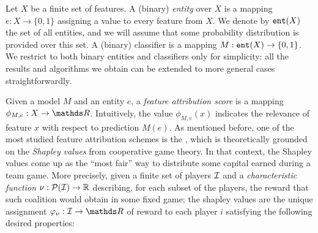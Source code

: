 

Let $X$ be a finite set of features. A (binary) \textit{entity} over $X$ is a mapping $e:X \to \{0, 1\}$ assigning a value to every feature from $X$. We denote by $\texttt{ent}{}(X)$ the set of all entities, and we will assume that some probability distribution is provided over this set.
A (binary) classifier is a mapping $M: \texttt{ent}{}(X) \to \{0, 1\}$. We restrict to both binary entities and classifiers only for simplicity: all the results and algorithms we obtain can be extended to more general cases straightforwardly. 

Given a model $M$ and an entity $e$, a \textit{feature attribution score} is a mapping $\phi_{M,e}:X \to \R$. Intuitively, the value $\phi_{M,e}(x)$ indicates the relevance of feature $x$ with respect to prediction $M(e)$. As mentioned before, one of the most 
studied feature attribution schemes is the \SHAPscore{} \parencite{shapOriginalPaper}, which is theoretically grounded on the \emph{Shapley values} \parencite{shapley1953value} from cooperative game theory. In that context, the Shapley values
come up as the ``most fair'' way to distribute some capital earned during a team game. More precisely, given a finite set of players $\mathcal{I}$ and a \emph{characteristic function} $\nu:\mathcal{P}(\mathcal{I})\to\mathbb{R}$ describing, for each subset
of the players, the reward that such coalition would obtain in some fixed game; the shapley values are the unique assignment $\varphi_\nu: \players \to \R$ of reward to each player $i$ satisfying the following desired properties:

